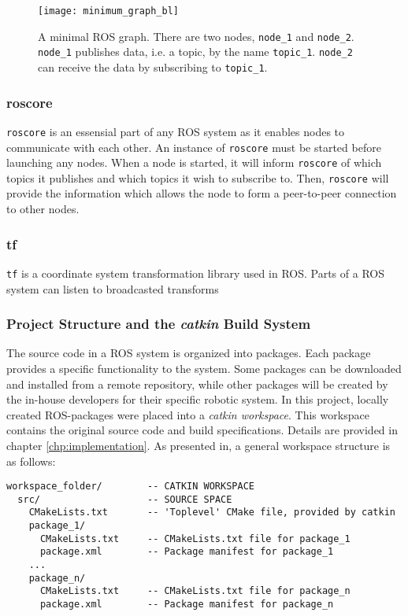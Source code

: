 \begin{figure}[h]
    \centering
    \texttt{[image: minimum\_graph\_bl]}
    \caption{A minimal \ac{ROS} graph. There are two nodes, \texttt{node\_1} and \texttt{node\_2}. \texttt{node\_1} publishes data, i.e. a topic, by the name \texttt{topic\_1}. \texttt{node\_2} can receive the data by subscribing to \texttt{topic\_1}.}
    \label{fig:minimum_graph}
\end{figure}

\subsubsection{roscore}

\texttt{roscore} is an essensial part of any \ac{ROS} system as it enables nodes to communicate with each other. An instance of \texttt{roscore} must be started before launching any nodes. When a node is started, it will inform \texttt{roscore} of which topics it publishes and which topics it wish to subscribe to. Then, \texttt{roscore} will provide the information which allows the node to form a peer-to-peer connection to other nodes.

\subsubsection{tf}

\texttt{tf}\cite{tf_paper} is a coordinate system transformation library used in \ac{ROS}. Parts of a \ac{ROS} system can listen to broadcasted transforms

\subsubsection{Project Structure and the \textit{catkin} Build System}
\label{sec:catkin}
The source code in a \ac{ROS} system is organized into packages. Each package provides a specific functionality to the system. Some packages can be downloaded and installed from a remote repository, while other packages will be created by the in-house developers for their specific robotic system. In this project, locally created ROS-packages were placed into a \textit{catkin workspace}. This workspace contains the  original source code and build specifications. Details are provided in chapter \ref{chp:implementation}. As presented in\cite{ROS_tut_pkg}, a general workspace structure is as follows:

\begin{verbatim}
workspace_folder/        -- CATKIN WORKSPACE
  src/                   -- SOURCE SPACE
    CMakeLists.txt       -- 'Toplevel' CMake file, provided by catkin
    package_1/
      CMakeLists.txt     -- CMakeLists.txt file for package_1
      package.xml        -- Package manifest for package_1
    ...
    package_n/
      CMakeLists.txt     -- CMakeLists.txt file for package_n
      package.xml        -- Package manifest for package_n
\end{verbatim}

